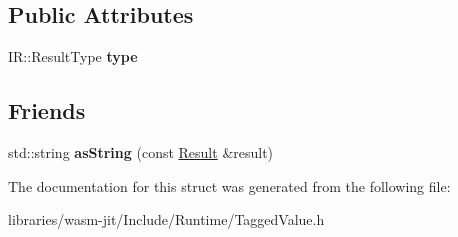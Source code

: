 \subsection*{Public Attributes}
\begin{DoxyCompactItemize}
\item 
\mbox{\label{struct_runtime_1_1_result_ae8e4a8adb21a77424a3ea8fad4c6b7e2}} 
I\+R\+::\+Result\+Type {\bfseries type}
\end{DoxyCompactItemize}
\subsection*{Friends}
\begin{DoxyCompactItemize}
\item 
\mbox{\label{struct_runtime_1_1_result_a8835bef356191a0b98e04c3c6840b110}} 
std\+::string {\bfseries as\+String} (const \mbox{\hyperlink{struct_runtime_1_1_result}{Result}} \&result)
\end{DoxyCompactItemize}


The documentation for this struct was generated from the following file\+:\begin{DoxyCompactItemize}
\item 
libraries/wasm-\/jit/\+Include/\+Runtime/Tagged\+Value.\+h\end{DoxyCompactItemize}

